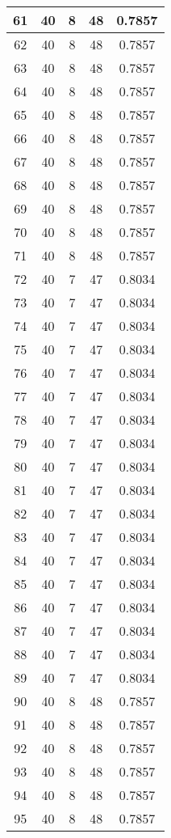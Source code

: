 \documentclass[letterpaper, 12pt]{article}
\begin{document}
\begin{longtable}{|c|c|c|c|c|}
61 & 40 & 8 & 48 & 0.7857 \\
\hline
62 & 40 & 8 & 48 & 0.7857 \\
\hline
63 & 40 & 8 & 48 & 0.7857 \\
\hline
64 & 40 & 8 & 48 & 0.7857 \\
\hline
65 & 40 & 8 & 48 & 0.7857 \\
\hline
66 & 40 & 8 & 48 & 0.7857 \\
\hline
67 & 40 & 8 & 48 & 0.7857 \\
\hline
68 & 40 & 8 & 48 & 0.7857 \\
\hline
69 & 40 & 8 & 48 & 0.7857 \\
\hline
70 & 40 & 8 & 48 & 0.7857 \\
\hline
71 & 40 & 8 & 48 & 0.7857 \\
\hline
72 & 40 & 7 & 47 & 0.8034 \\
\hline
73 & 40 & 7 & 47 & 0.8034 \\
\hline
74 & 40 & 7 & 47 & 0.8034 \\
\hline
75 & 40 & 7 & 47 & 0.8034 \\
\hline
76 & 40 & 7 & 47 & 0.8034 \\
\hline
77 & 40 & 7 & 47 & 0.8034 \\
\hline
78 & 40 & 7 & 47 & 0.8034 \\
\hline
79 & 40 & 7 & 47 & 0.8034 \\
\hline
80 & 40 & 7 & 47 & 0.8034 \\
\hline
81 & 40 & 7 & 47 & 0.8034 \\
\hline
82 & 40 & 7 & 47 & 0.8034 \\
\hline
83 & 40 & 7 & 47 & 0.8034 \\
\hline
84 & 40 & 7 & 47 & 0.8034 \\
\hline
85 & 40 & 7 & 47 & 0.8034 \\
\hline
86 & 40 & 7 & 47 & 0.8034 \\
\hline
87 & 40 & 7 & 47 & 0.8034 \\
\hline
88 & 40 & 7 & 47 & 0.8034 \\
\hline
89 & 40 & 7 & 47 & 0.8034 \\
\hline
90 & 40 & 8 & 48 & 0.7857 \\
\hline
91 & 40 & 8 & 48 & 0.7857 \\
\hline
92 & 40 & 8 & 48 & 0.7857 \\
\hline
93 & 40 & 8 & 48 & 0.7857 \\
\hline
94 & 40 & 8 & 48 & 0.7857 \\
\hline
95 & 40 & 8 & 48 & 0.7857 \\

\end{longtable}
\end{document}
